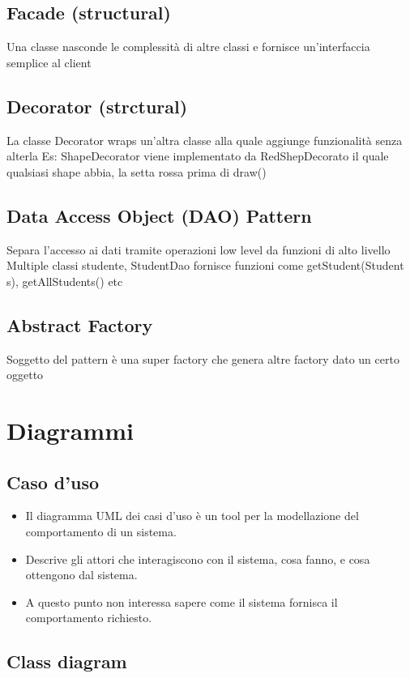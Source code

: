\documentclass[12pt]{article}
\begin{document}
\subsection{Facade (structural)}
Una classe nasconde le complessità di altre classi e fornisce un'interfaccia semplice al client
\subsection{Decorator (strctural)}
La classe Decorator wraps un'altra classe alla quale aggiunge funzionalità senza alterla
Es: ShapeDecorator viene implementato da RedShepDecorato il quale qualsiasi shape abbia, la setta rossa prima di draw()
\subsection{Data Access Object (DAO) Pattern}
Separa l'accesso ai dati tramite operazioni low level da funzioni di alto livello
Multiple classi studente, StudentDao fornisce funzioni come getStudent(Student s), getAllStudents()
etc
\subsection{Abstract Factory}
Soggetto del pattern è una super factory che genera altre factory dato un certo oggetto

\section{Diagrammi}

\subsection{Caso d'uso}
\begin{itemize}
\item Il diagramma UML dei casi d’uso è un tool per la
modellazione del comportamento di un sistema.
\item Descrive gli attori che interagiscono con il sistema, cosa
fanno, e cosa ottengono dal sistema.
\item A questo punto non interessa sapere come il sistema
fornisca il comportamento richiesto.
\end{itemize}

\subsection{Class diagram}
\end{document}
